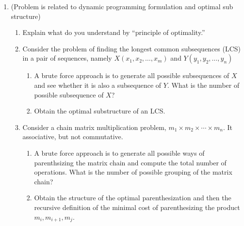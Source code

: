 \begin{enumerate}
	\item (Problem is related to dynamic programming formulation and optimal sub structure)
	\begin{enumerate}[label=\alph*.]
		\item Explain what do you understand by ``principle of optimality.''
		\item Consider the problem of finding the longest common subsequences (LCS) in a pair of sequences, namely $X(x_1, x_2,\dots, x_m)$ and $Y(y_1, y_2, \dots, y_n)$
		\begin{enumerate}
			\item A brute force approach is to generate all possible subsequences of $X$ and see whether it is also a subsequence of $Y$.  What is the number of possible subsequence of $X$?
			\item Obtain the optimal substructure of an LCS.  
		\end{enumerate}
		
		\item Consider a chain matrix multiplication problem, $m_1 \times m_2 \times \cdots \times m_n$.  It associative, but not commutative.  
		\begin{enumerate}
			\item  A brute force approach is to generate all possible ways of parenthsizing the matrix chain and compute the total number of operations.  What is the number of possible grouping of the matrix chain?
			\item Obtain the structure of the optimal parenthesization and then the recursive definition of the minimal cost of parenthesizing the product $m_i, m_{i+1}, m_j$.  
		\end{enumerate}
		
	\end{enumerate}
	


\end{enumerate}
